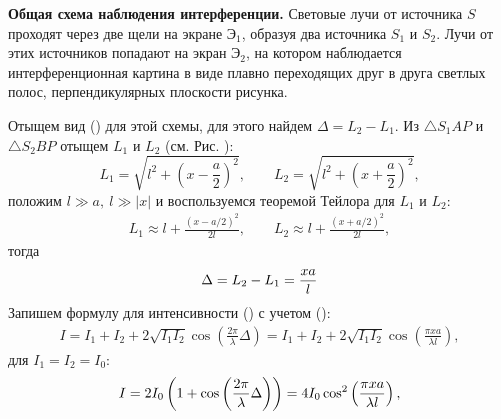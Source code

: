 ﻿\documentclass[__main__.tex]{subfiles}
\begin{document}
\textbf{Общая схема наблюдения интерференции.}
Световые лучи от источника $S$ проходят через две щели на экране $\text{Э}_1$, образуя два источника $S_1$ и $S_2$. Лучи от этих источников попадают на экран $\text{Э}_2$, на котором наблюдается интерференционная картина в виде плавно переходящих друг в друга светлых полос, перпендикулярных плоскости рисунка.

Отыщем вид () для этой схемы, для этого найдем $\Delta = L_2 - L_1$. Из
$\triangle S_1AP$ и $\triangle S_2BP$ отыщем $L_1$ и $L_2$ (см. Рис. ):
$$
L_1 = \sqrt{l^2 + \left(x-\frac{a}{2}\right)^2}, \qquad
L_2 = \sqrt{l^2 + \left(x+\frac{a}{2}\right)^2},
$$
положим $l \gg a, \ l \gg |x|$ и воспользуемся теоремой Тейлора для $L_1$ и $L_2$:
\begin{gather*}
L_1 \approx l + \frac{\left(x-a/2\right)^2}{2l}, \qquad
L_2 \approx l + \frac{\left(x+a/2\right)^2}{2l},
\end{gather*}
тогда
\begin{gather}
\llabel{o-02-schemediff}
\displaystyle \Delta = L_2 - L_1 = \frac{xa}{l}
\end{gather}
Запишем формулу для интенсивности () с учетом ():
\begin{gather*}
I = I_1 + I_2 + 2\sqrt{I_1 I_2}\cos\left(\frac{2\pi}{\lambda}\Delta\right) =
I_1 + I_2 + 2\sqrt{I_1 I_2}\cos\left(\frac{\pi x a}{\lambda l}\right),
\end{gather*}
для $I_1 = I_2 = I_0$:
\begin{gather}
\llabel{o-02-intensesch}
I = 2I_0\left(1 + \cos\left(\frac{2\pi}{\lambda}\Delta\right)\right) =
4I_0\cos^2\left(\frac{\pi xa}{\lambda l}\right),
\end{gather}
\end{document}
